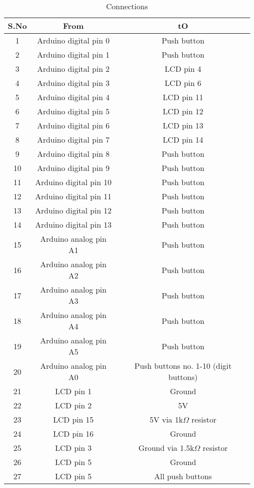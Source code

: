 \begin{table}[H]
\centering
\caption{Connections}
\label{tab:connections}
\begin{tabular}{ccc}
\toprule
S.No & From & tO \\
\midrule
1  & Arduino digital pin 0  & Push button  \\
2  & Arduino digital pin 1  & Push button\\
3  & Arduino digital pin 2  & LCD pin 4 \\
4  & Arduino digital pin 3  & LCD pin 6 \\
5  & Arduino digital pin 4  & LCD pin 11 \\
6  & Arduino digital pin 5  & LCD pin 12 \\
7  & Arduino digital pin 6  & LCD pin 13 \\
8  & Arduino digital pin 7  & LCD pin 14 \\
9  & Arduino digital pin 8  & Push button \\
10 & Arduino digital pin 9  & Push button  \\
11 & Arduino digital pin 10 & Push button  \\
12 & Arduino digital pin 11 & Push button  \\
13 & Arduino digital pin 12 & Push button \\
14 & Arduino digital pin 13 & Push button  \\
15 & Arduino analog pin A1 & Push button \\
16 & Arduino analog pin A2 & Push button  \\
17 & Arduino analog pin A3 & Push button  \\
18 & Arduino analog pin A4 & Push button  \\
19 & Arduino analog pin A5 & Push button  \\
20 & Arduino analog pin A0 & Push buttons no. 1-10 (digit buttons) \\
21 & LCD pin 1         & Ground \\
22 & LCD pin 2         & 5V \\
23 & LCD pin 15        & 5V via 1k$\Omega$ resistor \\
24 & LCD pin 16        & Ground \\
25 & LCD pin 3         & Ground via 1.5k$\Omega$ resistor \\
26 & LCD pin 5         & Ground \\
27 & LCD pin 5         & All push buttons \\
\bottomrule
\end{tabular}
\end{table}

